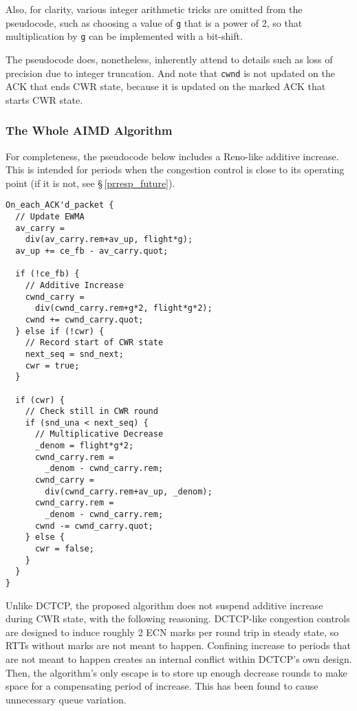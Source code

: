 Also, for clarity, various integer arithmetic tricks are omitted from the
pseudocode, such as choosing a value of \texttt{g} that is a power of 2, so that
multiplication by \texttt{g} can be implemented with a bit-shift.

The pseudocode does, nonetheless, inherently attend to details such as loss of
precision due to integer truncation. And note that \texttt{cwnd} is not updated
on the ACK that ends CWR state, because it is updated on the marked ACK that
starts CWR state.

\subsubsection{The Whole AIMD Algorithm}\label{prresp_AIMD}

For completeness, the pseudocode below %
includes a Reno-like additive increase.
This is intended for periods when the congestion control is close to its
operating point (if it is not, see \S\,\ref{prresp_future}).

\begin{verbatim}
On_each_ACK'd_packet {
  // Update EWMA
  av_carry = 
    div(av_carry.rem+av_up, flight*g);
  av_up += ce_fb - av_carry.quot;

  if (!ce_fb) {
    // Additive Increase
    cwnd_carry = 
      div(cwnd_carry.rem+g*2, flight*g*2);
    cwnd += cwnd_carry.quot;
  } else if (!cwr) {
    // Record start of CWR state
    next_seq = snd_next;
    cwr = true;
  }

  if (cwr) {
    // Check still in CWR round
    if (snd_una < next_seq) {
      // Multiplicative Decrease
      _denom = flight*g*2;
      cwnd_carry.rem = 
        _denom - cwnd_carry.rem;
      cwnd_carry = 
        div(cwnd_carry.rem+av_up, _denom);
      cwnd_carry.rem = 
        _denom - cwnd_carry.rem;
      cwnd -= cwnd_carry.quot;
    } else {
      cwr = false;
    }
  }
}
\end{verbatim}

Unlike DCTCP, the proposed algorithm does not suspend additive increase during
CWR state, with the following reasoning. DCTCP-like congestion controls are
designed to induce roughly 2 ECN marks per round trip in steady state, so RTTs
without marks are not meant to happen. Confining increase to periods that are
not meant to happen creates an internal conflict within DCTCP's own design.
Then, the algorithm's only escape is to store up enough decrease rounds to make
space for a compensating period of increase. This has been found to cause
unnecessary queue variation.

